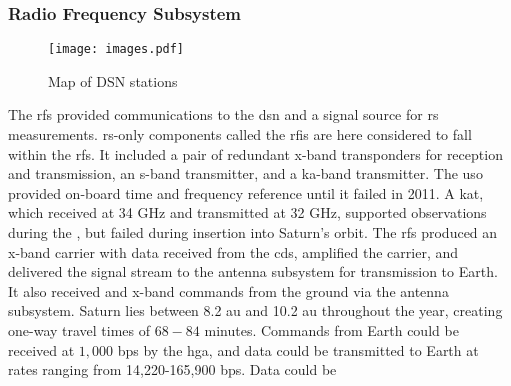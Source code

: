 \documentclass[crop=false,class=article,oneside]{standalone}
\begin{document}
        \subsubsection{%
            \footnotesize{Radio Frequency Subsystem}
        }
            \label{subsubsec:usr_rad_freq_subsys}
            \begin{wrapfigure}[16]{r}{0.5\textwidth}
            	\centering
            	\vspace{-5ex}
            	\texttt{[image: images.pdf]}
            	\caption{Map of DSN stations}
            	\label{fig:usr_dsn_map_1}
            \end{wrapfigure}
            The \gls{rfs} provided communications to the
            \gls{dsn} and a signal source for \gls{rs}
            measurements. \gls{rs}-only components called
            the \gls{rfis} are here considered to fall within
            the \gls{rfs}. It included a pair of redundant
            \gls{x-band} \glspl{transponder} for reception
            and transmission, an \gls{s-band}
            \gls{transmitter}, and a \gls{ka-band}
            \gls{transmitter}. The \gls{uso} provided
            on-board time and \gls{frequency} reference until
            it failed in 2011. A \gls{kat}, which received
            at 34 GHz and transmitted
             at 32 GHz,
            supported
            observations during the
            , but failed
            during insertion into Saturn's orbit. The
            \gls{rfs} produced an \gls{x-band} \gls{carrier}
             with data
            received from the \gls{cds}, amplified the
             carrier, and
            delivered the signal stream to the antenna
            subsystem for transmission to Earth. It also
            received and 
            \gls{x-band} commands from the ground via the
            antenna subsystem. Saturn lies between 8.2
            \gls{au} and 10.2 \gls{au} throughout the year,
            creating one-way travel times of $68-84$ minutes.
            Commands from Earth could be received at $1,000$
            \gls{bps} by the \gls{hga}, and data could be
            transmitted to Earth at rates ranging from
            14,220-165,900 \gls{bps}. Data could be
\end{document}
